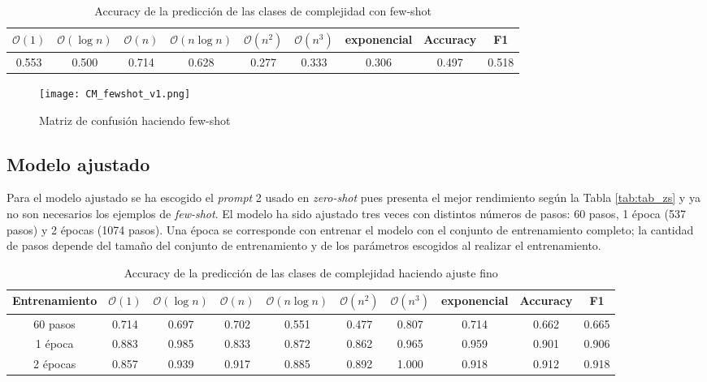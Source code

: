 \documentclass[12pt,twoside]{article}
\begin{document}
\begin{table}[H]
    \centering
    \small
    \begin{tabular}{c c c c c c c|c c}
        $\mathcal{O}(1)$ & $\mathcal{O}(\log n)$ & $\mathcal{O}(n)$ & $\mathcal{O}(n\log n)$ & $\mathcal{O}(n^2)$ & $\mathcal{O}(n^3)$ & exponencial & Accuracy & F1 \\ \hline
        0.553 & 0.500 & 0.714 & 0.628 & 0.277 & 0.333 & 0.306 & 0.497 & 0.518
    \end{tabular}
    \normalsize
    \caption{Accuracy de la predicción de las clases de complejidad con few-shot}
    \label{tab:tab_fs}
\end{table}

\begin{figure}[H]
  \centering
    \texttt{[image: CM\_fewshot\_v1.png]}
  \caption{Matriz de confusión haciendo few-shot}
  \label{fig:confmat_fs}
\end{figure}

\subsection{Modelo ajustado}
Para el modelo ajustado se ha escogido el \textit{prompt} 2 usado en \textit{zero-shot} pues presenta el mejor rendimiento según la Tabla \ref{tab:tab_zs} y ya no son necesarios los ejemplos de \textit{few-shot}. El modelo ha sido ajustado tres veces con distintos números de pasos: 60 pasos, 1 época (537 pasos) y 2 épocas (1074 pasos). Una época se corresponde con entrenar el modelo con el conjunto de entrenamiento completo; la cantidad de pasos depende del tamaño del conjunto de entrenamiento y de los parámetros escogidos al realizar el entrenamiento.

\begin{table}[H]
    \centering
    \small
    \begin{tabular}{c|c c c c c c c|c c}
        Entrenamiento & $\mathcal{O}(1)$ & $\mathcal{O}(\log n)$ & $\mathcal{O}(n)$ & $\mathcal{O}(n\log n)$ & $\mathcal{O}(n^2)$ & $\mathcal{O}(n^3)$ & exponencial & Accuracy & F1 \\ \hline
        60 pasos & 0.714 & 0.697 & 0.702 & 0.551 & 0.477 & 0.807 & 0.714 & 0.662 & 0.665 \\
        1 época & 0.883 & 0.985 & 0.833 & 0.872 & 0.862 & 0.965 & 0.959 & 0.901 & 0.906 \\
        2 épocas & 0.857 & 0.939 & 0.917 & 0.885 & 0.892 & 1.000 & 0.918 & 0.912 & 0.918 
    \end{tabular}
    \normalsize
    \caption{Accuracy de la predicción de las clases de complejidad haciendo ajuste fino}
    \label{tab:tab_QLoRA}
\end{table}
\end{document}
